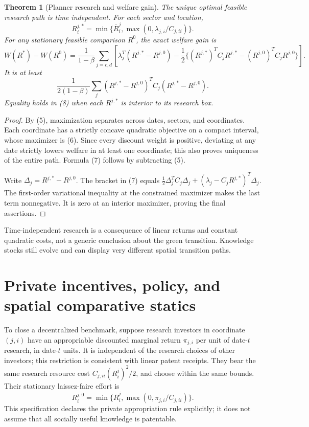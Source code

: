 \documentclass[11pt,a4paper]{article}
\newtheorem{theorem}{Theorem}[section]
\theoremstyle{definition}
\theoremstyle{remark}
\begin{document}
\begin{theorem}[Planner research and welfare gain]
The unique optimal feasible research path is time independent. For each sector and location,
\[
 R_i^{j,*}=\min\{\bar R_i^j,\max(0,\lambda_{j,i}/C_{j,ii})\}.
 \tag{6}
\]
For any stationary feasible comparison $R^0$, the exact welfare gain is
\[
 W(R^*)-W(R^0)=\frac1{1-\beta}\sum_{j=c,d}
 \left[\lambda_j^T(R^{j,*}-R^{j,0})
 -\frac12\{(R^{j,*})^TC_jR^{j,*}-(R^{j,0})^TC_jR^{j,0}\}\right].
 \tag{7}
\]
It is at least
\[
 \frac1{2(1-\beta)}\sum_j
 (R^{j,*}-R^{j,0})^TC_j(R^{j,*}-R^{j,0}).
 \tag{8}
\]
Equality holds in (8) when each $R^{j,*}$ is interior to its research box.
\end{theorem}
\begin{proof}
By (5), maximization separates across dates, sectors, and coordinates. Each coordinate has a strictly concave quadratic objective on a compact interval, whose maximizer is (6). Since every discount weight is positive, deviating at any date strictly lowers welfare in at least one coordinate; this also proves uniqueness of the entire path. Formula (7) follows by subtracting (5).

Write $\Delta_j=R^{j,*}-R^{j,0}$. The bracket in (7) equals
$\tfrac12\Delta_j^TC_j\Delta_j+(\lambda_j-C_jR^{j,*})^T\Delta_j$.
The first-order variational inequality at the constrained maximizer makes the last term nonnegative. It is zero at an interior maximizer, proving the final assertions.
\end{proof}

Time-independent research is a consequence of linear returns and constant quadratic costs, not a generic conclusion about the green transition. Knowledge stocks still evolve and can display very different spatial transition paths.
\section{Private incentives, policy, and spatial comparative statics}
To close a decentralized benchmark, suppose research investors in coordinate $(j,i)$ have an appropriable discounted marginal return $\pi_{j,i}$ per unit of date-$t$ research, in date-$t$ units. It is independent of the research choices of other investors; this restriction is consistent with linear patent receipts. They bear the same research resource cost $C_{j,ii}(R_i^j)^2/2$, and choose within the same bounds. Their stationary laissez-faire effort is
\[
 R_i^{j,0}=\min\{\bar R_i^j,\max(0,\pi_{j,i}/C_{j,ii})\}.
\]
This specification declares the private appropriation rule explicitly; it does not assume that all socially useful knowledge is patentable.
\end{document}
